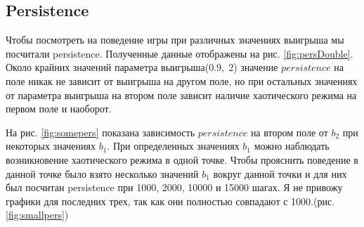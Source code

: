 \documentclass[12pt]{article}
\begin{document}
    \subsection{Persistence}
        Чтобы посмотреть на поведение игры при различных значениях выигрыша мы посчитали persistence. Полученные данные отображены на рис. \ref{fig:persDouble}.
        Около крайних значений параметра выигрыша($0.9,\;2$) значение $persistence$ на поле никак не зависит от выигрыша на другом поле, но при остальных значениях от параметра выигрыша на втором поле зависит наличие хаотического режима на первом поле и наоборот.
        
        На рис. \ref{fig:somepers} показана зависимость $persistence$ на втором поле от $b_2$ при некоторых значениях $b_1$. При определенных значениях $b_1$ можно наблюдать возникновение хаотического режима в одной точке.
        Чтобы прояснить поведение в данной точке было взято несколько значений $b_1$ вокруг данной точки и для них был посчитан persistence при 1000, 2000, 10000 и 15000 шагах. Я не привожу графики для последних трех, так как они полностью совпадают с 1000.(рис. \ref{fig:smallpers})
        
\end{document}
